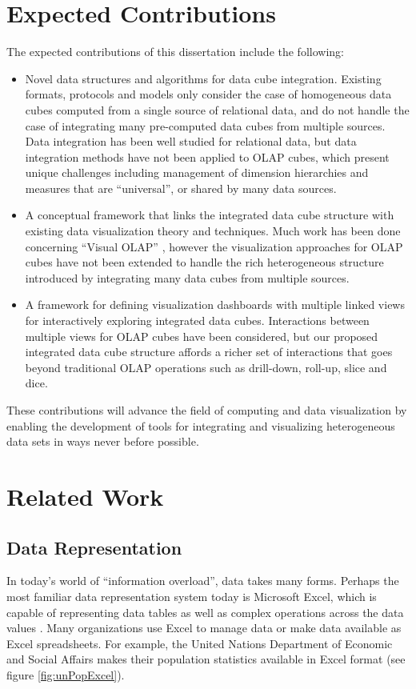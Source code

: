 \documentclass[12pt]{article}
\begin{document}
\begin{doublespace}
\pagebreak
\section{Expected Contributions}
The expected contributions of this dissertation include the following:
\begin{itemize}
\item Novel data structures and algorithms for data cube integration. Existing formats, protocols and models only consider the case of homogeneous data cubes computed from a single source of relational data, and do not handle the case of integrating many pre-computed data cubes from multiple sources. Data integration has been well studied for relational data, but data integration methods have not been applied to OLAP cubes, which present unique challenges including management of dimension hierarchies and measures that are ``universal'', or shared by many data sources.
\item A conceptual framework that links the integrated data cube structure with existing data visualization theory and techniques. Much work has been done concerning ``Visual OLAP'' \cite{mansmann2008visual}, however the visualization approaches for OLAP cubes have not been extended to handle the rich heterogeneous structure introduced by integrating many data cubes from multiple sources.
\item A framework for defining visualization dashboards with multiple linked views for interactively exploring integrated data cubes. Interactions between multiple views for OLAP cubes have been considered, but our proposed integrated data cube structure affords a richer set of interactions that goes beyond traditional OLAP operations such as drill-down, roll-up, slice and dice.
\end{itemize}

These contributions will advance the field of computing and data visualization by enabling the development of tools for integrating and visualizing heterogeneous data sets in ways never before possible.
\pagebreak
\section{Related Work}
\subsection{Data Representation}
In today's world of ``information overload'', data takes many forms. Perhaps the most familiar data representation system today is Microsoft Excel, which is capable of representing data tables as well as complex operations across the data values \cite{eick2000visualizing}. Many organizations use Excel to manage data or make data available as Excel spreadsheets. For example, the United Nations Department of Economic and Social Affairs makes their population statistics available in Excel format (see figure \ref{fig:unPopExcel}).


\end{doublespace}
\end{document}
